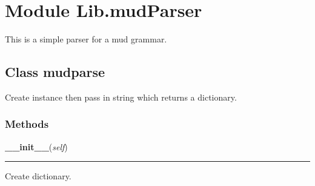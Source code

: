 %
%
%


\section{Module Lib.mudParser}

    \label{Lib:mudParser}
This is a simple parser for a mud grammar.



\subsection{Class mudparse}

    \label{Lib:mudParser:mudparse}
Create instance then pass in string which returns a dictionary.



  \subsubsection{Methods}

    \label{Lib:mudParser:mudparse:__init__}

    \vspace{0.5ex}

    \begin{boxedminipage}{\textwidth}

    \raggedright \textbf{\_\_init\_\_}(\textit{self})

    \vspace{-1.5ex}

    \rule{\textwidth}{0.5\fboxrule}
    Create dictionary.

    \vspace{1ex}

    \end{boxedminipage}


